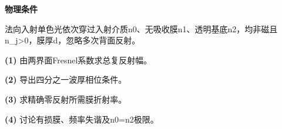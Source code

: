 \textbf{物理条件}\par 法向入射单色光依次穿过入射介质n0、无吸收膜n1、透明基底n2，均非磁且n\_j>0，膜厚d，忽略多次背面反射。
\par\noindent\textbf{(1)} 由两界面Fresnel系数求总复反射幅。
\par\noindent\textbf{(2)} 导出四分之一波厚相位条件。
\par\noindent\textbf{(3)} 求精确零反射所需膜折射率。
\par\noindent\textbf{(4)} 讨论有损膜、频率失谐及n0=n2极限。
